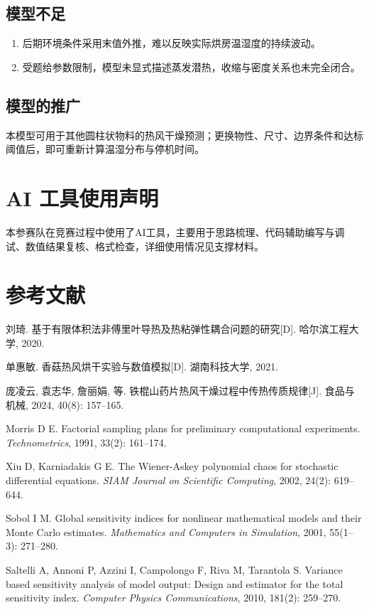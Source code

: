 \documentclass[UTF8,a4paper,12pt]{ctexart}
\begin{document}
\subsection{模型不足}
\begin{enumerate}[label=\arabic*、,leftmargin=2.5em,itemsep=0.4em]
  \item 后期环境条件采用末值外推，难以反映实际烘房温湿度的持续波动。
  \item 受题给参数限制，模型未显式描述蒸发潜热，收缩与密度关系也未完全闭合。
\end{enumerate}

\subsection{模型的推广}
本模型可用于其他圆柱状物料的热风干燥预测；更换物性、尺寸、边界条件和达标阈值后，即可重新计算温湿分布与停机时间。

\section{AI 工具使用声明}
本参赛队在竞赛过程中使用了AI工具，主要用于思路梳理、代码辅助编写与调试、数值结果复核、格式检查，详细使用情况见支撑材料。

\section{参考文献}
\begin{enumerate}[label={[\arabic*]},leftmargin=3em,itemsep=0pt,topsep=0pt]
  \item 刘琦. 基于有限体积法非傅里叶导热及热粘弹性耦合问题的研究[D]. 哈尔滨工程大学, 2020.
  \item 单惠敏. 香菇热风烘干实验与数值模拟[D]. 湖南科技大学, 2021.
  \item 庞凌云, 袁志华, 詹丽娟, 等. 铁棍山药片热风干燥过程中传热传质规律[J]. 食品与机械, 2024, 40(8): 157--165.
  \item Morris D E. Factorial sampling plans for preliminary computational experiments. \textit{Technometrics}, 1991, 33(2): 161--174.
  \item Xiu D, Karniadakis G E. The Wiener-Askey polynomial chaos for stochastic differential equations. \textit{SIAM Journal on Scientific Computing}, 2002, 24(2): 619--644.
  \item Sobol I M. Global sensitivity indices for nonlinear mathematical models and their Monte Carlo estimates. \textit{Mathematics and Computers in Simulation}, 2001, 55(1--3): 271--280.
  \item Saltelli A, Annoni P, Azzini I, Campolongo F, Riva M, Tarantola S. Variance based sensitivity analysis of model output: Design and estimator for the total sensitivity index. \textit{Computer Physics Communications}, 2010, 181(2): 259--270.
\end{enumerate}
\end{document}
